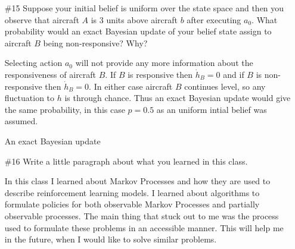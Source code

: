 \documentclass[12pt, oneside]{article}
\begin{document}
\begin{enumerate}
  \item[\#15] %
    Suppose your initial belief is uniform over the state space and then you
    observe that aircraft $A$ is $3$ units above aircraft $b$ after executing
    $a_0$.
    What probability would an exact Bayesian update of your belief state assign to
    aircraft $B$ being non-responsive?
    Why?

    Selecting action $a_0$ will not provide any more information about the
    responsiveness of aircraft $B$.
    If $B$ is responsive then $\dot{h}_B = 0$ and if $B$ is non-responsive then
    $\dot{h}_B = 0$.
    In either case aircraft $B$ continues level, so any fluctuation to $h$ is
    through chance.
    Thus an exact Bayesian update would give the same probability, in this
    case $p = 0.5$ as an uniform intial belief was assumed.

    An exact Bayesian update 

  \item[\#16] %
    Write a little paragraph about what you learned in this class.

    In this class I learned about Markov Processes and how they are used to
    describe reinforcement learning models.
    I learned about algorithms to formulate policies for both observable
    Markov Processes and partially observable processes.
    The main thing that stuck out to me was the process used to formulate these
    problems in an accessible manner.
    This will help me in the future, when I would like to solve similar
    problems.
\end{enumerate}
\end{document}
